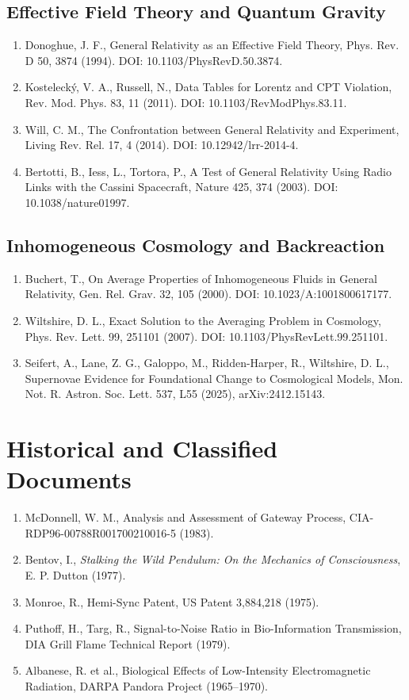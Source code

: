 \documentclass[12pt,oneside]{book}
\begin{document}
\subsection{Effective Field Theory and Quantum Gravity}

\begin{enumerate}
    \item Donoghue, J. F., General Relativity as an Effective Field Theory, Phys. Rev. D 50, 3874 (1994). DOI: 10.1103/PhysRevD.50.3874.
    \item Kostelecký, V. A., Russell, N., Data Tables for Lorentz and CPT Violation, Rev. Mod. Phys. 83, 11 (2011). DOI: 10.1103/RevModPhys.83.11.
    \item Will, C. M., The Confrontation between General Relativity and Experiment, Living Rev. Rel. 17, 4 (2014). DOI: 10.12942/lrr-2014-4.
    \item Bertotti, B., Iess, L., Tortora, P., A Test of General Relativity Using Radio Links with the Cassini Spacecraft, Nature 425, 374 (2003). DOI: 10.1038/nature01997.
\end{enumerate}

\subsection{Inhomogeneous Cosmology and Backreaction}

\begin{enumerate}
    \item Buchert, T., On Average Properties of Inhomogeneous Fluids in General Relativity, Gen. Rel. Grav. 32, 105 (2000). DOI: 10.1023/A:1001800617177.
    \item Wiltshire, D. L., Exact Solution to the Averaging Problem in Cosmology, Phys. Rev. Lett. 99, 251101 (2007). DOI: 10.1103/PhysRevLett.99.251101.
    \item Seifert, A., Lane, Z. G., Galoppo, M., Ridden-Harper, R., Wiltshire, D. L., Supernovae Evidence for Foundational Change to Cosmological Models, Mon. Not. R. Astron. Soc. Lett. 537, L55 (2025), arXiv:2412.15143.
\end{enumerate}

\section{Historical and Classified Documents}

\begin{enumerate}
    \item McDonnell, W. M., Analysis and Assessment of Gateway Process, CIA-RDP96-00788R001700210016-5 (1983).
    \item Bentov, I., \textit{Stalking the Wild Pendulum: On the Mechanics of Consciousness}, E. P. Dutton (1977).
    \item Monroe, R., Hemi-Sync Patent, US Patent 3,884,218 (1975).
    \item Puthoff, H., Targ, R., Signal-to-Noise Ratio in Bio-Information Transmission, DIA Grill Flame Technical Report (1979).
    \item Albanese, R. et al., Biological Effects of Low-Intensity Electromagnetic Radiation, DARPA Pandora Project (1965--1970).
\end{enumerate}
\end{document}
